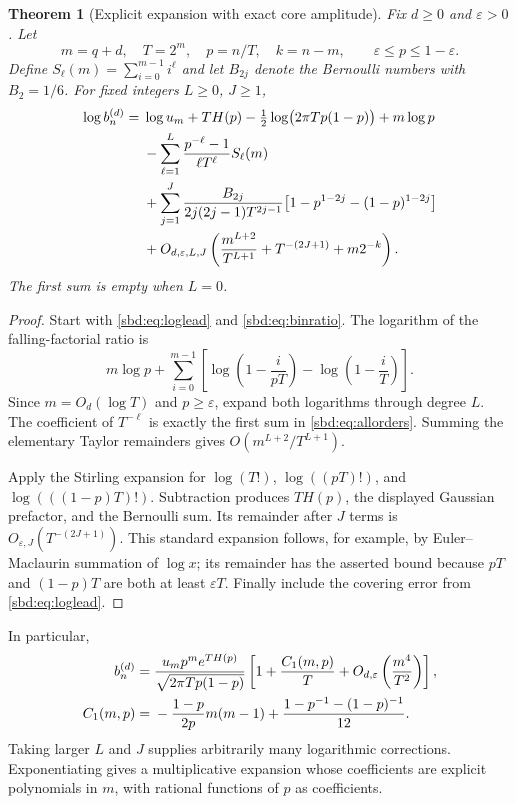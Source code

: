 \documentclass[11pt,a4paper]{article}
\newtheorem{theorem}{Theorem}[section]
\theoremstyle{definition}
\begin{document}
\begin{theorem}[Explicit expansion with exact core amplitude]\label{sbd:thm:expansion}
Fix $d\ge0$ and $\varepsilon>0$. Let
\[
 m=q+d,\quad T=2^m,\quad p=n/T,\quad k=n-m,
 \qquad \varepsilon\le p\le1-\varepsilon.
\]
Define $S_\ell(m)=\sum_{i=0}^{m-1}i^\ell$ and let $B_{2j}$ denote the
Bernoulli numbers with $B_2=1/6$. For fixed integers $L\ge0$, $J\ge1$,
\begin{align}\label{sbd:eq:allorders}
 \log b_n^{(d)}={}&\log u_m+T H(p)
 -\tfrac12\log\bigl(2\pi T p(1-p)\bigr)+m\log p\notag\\
 &-\sum_{\ell=1}^{L}
       \frac{p^{-\ell}-1}{\ell T^\ell}S_\ell(m)\notag\\
 &+\sum_{j=1}^{J}\frac{B_{2j}}{2j(2j-1)T^{2j-1}}
       \bigl[1-p^{1-2j}-(1-p)^{1-2j}\bigr]\notag\\
 &+O_{d,\varepsilon,L,J}\left(
       \frac{m^{L+2}}{T^{L+1}}+T^{-(2J+1)}+m2^{-k}\right).
\end{align}
The first sum is empty when $L=0$.
\end{theorem}
\begin{proof}
Start with \eqref{sbd:eq:loglead} and \eqref{sbd:eq:binratio}.
The logarithm of the falling-factorial ratio is
\[
 m\log p+\sum_{i=0}^{m-1}
 \left[\log\left(1-\frac{i}{pT}\right)
             -\log\left(1-\frac{i}{T}\right)\right].
\]
Since $m=O_d(\log T)$ and $p\ge\varepsilon$, expand both logarithms
through degree $L$. The coefficient of $T^{-\ell}$ is exactly the
first sum in \eqref{sbd:eq:allorders}. Summing the elementary Taylor
remainders gives $O(m^{L+2}/T^{L+1})$.

Apply the Stirling expansion for $\log(T!)$, $\log((pT)!)$, and
$\log(((1-p)T)!)$. Subtraction produces $T H(p)$, the displayed
Gaussian prefactor, and the Bernoulli sum. Its remainder after $J$
terms is $O_{\varepsilon,J}(T^{-(2J+1)})$. This standard expansion follows,
for example, by Euler--Maclaurin summation of $\log x$; its remainder
has the asserted bound because $pT$ and $(1-p)T$ are both at least
$\varepsilon T$. Finally include the covering error from
\eqref{sbd:eq:loglead}.
\end{proof}

In particular,
\begin{align}\label{sbd:eq:first-prefactor}
 b_n^{(d)}={}&
 \frac{u_m p^m e^{T H(p)}}{\sqrt{2\pi T p(1-p)}}
 \left[1+\frac{C_1(m,p)}T
             +O_{d,\varepsilon}\left(\frac{m^4}{T^2}\right)\right],\\
 C_1(m,p)={}&-\frac{1-p}{2p}m(m-1)
       +\frac{1-p^{-1}-(1-p)^{-1}}{12}.\notag
\end{align}
Taking larger $L$ and $J$ supplies arbitrarily many logarithmic
corrections. Exponentiating gives a multiplicative expansion whose
coefficients are explicit polynomials in $m$, with rational functions
of $p$ as coefficients.
\end{document}
